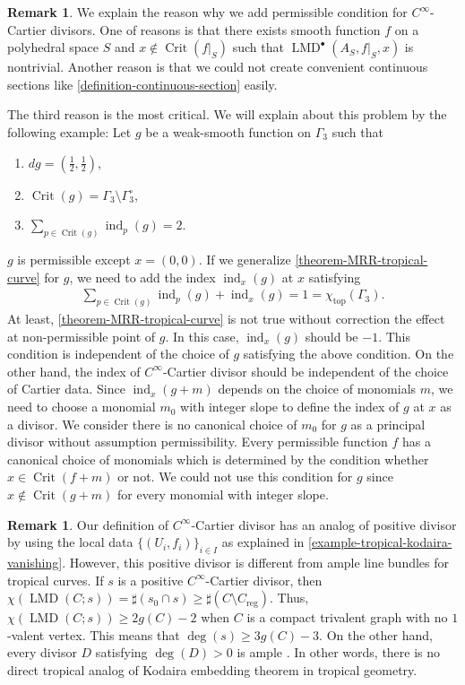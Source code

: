 \documentclass[a4paper,dvipdfmx,reqno,12pt]{amsart}
\theoremstyle{definition}
\newtheorem{remark}[theorem]{Remark}
\newcommand{\opn}[1]{\operatorname{#1}}
\numberwithin{equation}{section}
\begin{document}
\begin{remark}
\label{remark-non-permissible-divisor}
We explain the reason why we add permissible condition for 
$C^{\infty}$-Cartier divisors. 
One of reasons is that there exists smooth function $f$
on a polyhedral space $S$ and 
$x\notin\opn{Crit}(f|_S)$ such that
$\opn{LMD}^{\bullet}(A_S,f|_{S},x)$ is nontrivial.
Another reason is that we could not create 
convenient continuous sections like 
\cref{definition-continuous-section} easily.

The third reason is the most critical. 
We will explain about this problem by the following 
example:
Let 
$g$ be a weak-smooth function on 
$\Gamma_3$
such that 
\begin{enumerate}
\item $dg=(\frac{1}{2},\frac{1}{2})$,
\item $\opn{Crit}(g)=\Gamma_3\setminus \Gamma_3^{\circ}$,
\item $\sum_{p\in \opn{Crit}(g)}\opn{ind}_p(g)=2$.
\end{enumerate}
$g$ is permissible except $x=(0,0)$.
If we generalize 
\cref{theorem-MRR-tropical-curve} for $g$, 
we need to add the index $\opn{ind}_x(g)$ at $x$ satisfying
\begin{align}
\sum_{p\in \opn{Crit}(g)}\opn{ind}_p(g)+
\opn{ind}_x(g)=1=\chi_{\opn{top}}(\Gamma_3).
\end{align}
At least, \cref{theorem-MRR-tropical-curve} is not
true without correction the effect at non-permissible point
of $g$.
In this case, $\opn{ind}_x(g)$ should be $-1$.
This condition is independent of the choice
of $g$ satisfying the above condition.
On the other hand, the index of $C^{\infty}$-Cartier
divisor should be independent of the choice of
Cartier data.
Since $\opn{ind}_x(g+m)$ depends on the choice
of monomials $m$, we need to choose a monomial $m_0$
with integer slope to 
define the index of $g$ at $x$ as a divisor.
We consider there is no canonical choice
of $m_0$ for $g$ as a principal divisor without
assumption permissibility.
Every permissible function $f$ has a canonical choice
of monomials which is determined by the condition 
whether $x\in \opn{Crit}(f+m)$ or not.
We could not use this condition for $g$ since 
$x\notin \opn{Crit}(g+m)$ for every monomial with
integer slope.
\end{remark}

\begin{remark}
Our definition of $C^{\infty}$-Cartier divisor 
has an analog of positive divisor by using 
the local data $\{(U_i,f_i)\}_{i\in I}$ as 
explained in \cref{example-tropical-kodaira-vanishing}.
However, this positive divisor is different 
from ample line bundles for tropical curves. 
If $s$ is a positive $C^{\infty}$-Cartier divisor, then
$\chi(\opn{LMD}(C;s))=\sharp(s_0\cap s)\geq \sharp 
(C\setminus C_{\opn{reg}})$. 
Thus, $\chi(\opn{LMD}(C;s))\geq 2g(C)-2$
when $C$ is a compact trivalent
graph with no $1$-valent vertex. This means that
$\opn{deg}(s)\geq 3g(C)-3$.
On the other hand, every divisor $D$ satisfying
$\opn{deg}(D)>0$ is ample \cite[Corollary 43]{MR2892941}.
In other words, there is no direct tropical
analog of Kodaira embedding theorem
in tropical geometry.
\end{remark}
\end{document}
